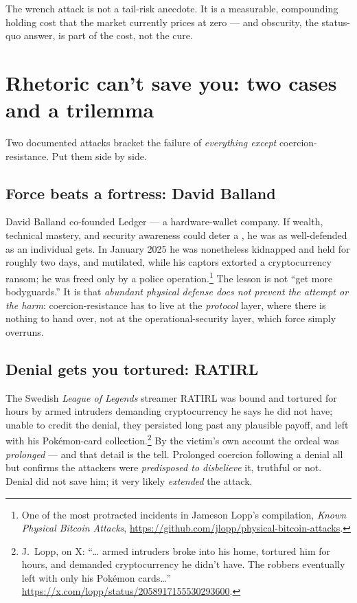 \documentclass[a4paper,11pt]{report}
\begin{document}
\begin{keyidea}
The wrench attack is not a tail-risk anecdote. It is a measurable, compounding
holding cost that the market currently prices at zero — and obscurity, the
status-quo answer, is part of the cost, not the cure.
\end{keyidea}

\section{Rhetoric can't save you: two cases and a trilemma}
\label{sec:trilemma}
Two documented attacks bracket the failure of \emph{everything except}
coercion-resistance. Put them side by side.

\subsection{Force beats a fortress: David Balland}
David Balland co-founded Ledger — a hardware-wallet company. If wealth,
technical mastery, and security awareness could deter a \wrench{}, he was as
well-defended as an individual gets. In January 2025 he was nonetheless
kidnapped and held for roughly two days, and mutilated, while his captors
extorted a cryptocurrency ransom; he was freed only by a police
operation.\footnote{One of the most protracted incidents in Jameson Lopp's
compilation, \emph{Known Physical Bitcoin Attacks},
\url{https://github.com/jlopp/physical-bitcoin-attacks}.} The lesson is not
``get more bodyguards.'' It is that \emph{abundant physical defense does not
prevent the attempt or the harm}: coercion-resistance has to live at the
\emph{protocol} layer, where there is nothing to hand over, not at the
operational-security layer, which force simply overruns.

\subsection{Denial gets you tortured: RATIRL}
The Swedish \emph{League of Legends} streamer RATIRL was bound and tortured for
hours by armed intruders demanding cryptocurrency he says he did not
have; unable to credit the denial, they persisted long past any plausible payoff,
and left with his Pokémon-card collection.\footnote{J.\ Lopp, on X: ``\ldots
armed intruders broke into his home, tortured him for hours, and demanded
cryptocurrency he didn't have. The robbers eventually left with only his
Pok\'emon cards\ldots'' \url{https://x.com/lopp/status/2058917155530293600}.} By
the victim's own account the ordeal was \emph{prolonged} — and that detail is the
tell. Prolonged coercion following a denial all but confirms the attackers were
\emph{predisposed to disbelieve} it, truthful or not. Denial did not save him;
it very likely \emph{extended} the attack.
\end{document}
